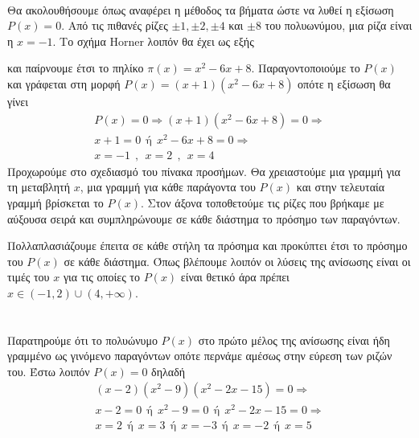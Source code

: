 \lysh\\
Θα ακολουθήσουμε όπως αναφέρει η μέθοδος τα βήματα ώστε να λυθεί η εξίσωση $ P(x)=0 $. Από τις πιθανές ρίζες $ \pm 1,\pm 2,\pm 4 $ και $ \pm8 $ του πολυωνύμου, μια ρίζα είναι η $ x=-1 $. Το σχήμα Horner λοιπόν θα έχει ως εξής
\begin{center}
\end{center}
και παίρνουμε έτσι το πηλίκο $ \pi(x)=x^2-6x+8 $. Παραγοντοποιούμε το $ P(x) $ και γράφεται στη μορφή $ P(x)=(x+1)\left(x^2-6x+8 \right) $ οπότε η εξίσωση θα γίνει
\begin{gather*}
P(x)=0\Rightarrow (x+1)\left(x^2-6x+8 \right)=0\Rightarrow\\
x+1=0\ \ \textrm{ή}\ \ x^2-6x+8=0\Rightarrow\\
x=-1\ \ ,\ \ x=2\ \ ,\ \ x=4
\end{gather*}
Προχωρούμε στο σχεδιασμό του πίνακα προσήμων. Θα χρειαστούμε μια γραμμή για τη μεταβλητή $ x $, μια γραμμή για κάθε παράγοντα του $ P(x) $ και στην τελευταία γραμμή βρίσκεται το $ P(x) $. Στον άξονα τοποθετούμε τις ρίζες που βρήκαμε με αύξουσα σειρά και συμπληρώνουμε σε κάθε διάστημα το πρόσημο των παραγόντων.
\begin{center}
\end{center}
Πολλαπλασιάζουμε έπειτα σε κάθε στήλη τα πρόσημα και προκύπτει έτσι το πρόσημο του $ P(x) $ σε κάθε διάστημα. Όπως βλέπουμε λοιπόν οι λύσεις της ανίσωσης είναι οι τιμές του $ x $ για τις οποίες το $ P(x) $ είναι θετικό άρα πρέπει $ x\in(-1,2)\cup(4,+\infty) $.\\\\
\lysh\\
Παρατηρούμε ότι το πολυώνυμο $ P(x) $ στο πρώτο μέλος της ανίσωσης είναι ήδη γραμμένο ως γινόμενο παραγόντων οπότε περνάμε αμέσως στην εύρεση των ριζών του. Έστω λοιπόν $ P(x)=0 $ δηλαδή
\begin{gather*}
(x-2)\left(x^2-9 \right)\left(x^2-2x-15\right)=0\Rightarrow\\
x-2=0\ \ \textrm{ή}\ \ x^2-9=0\ \ \textrm{ή}\ \ x^2-2x-15=0\Rightarrow\\
x=2\ \ \textrm{ή}\ \ x=3\ \ \textrm{ή}\ \ x=-3\ \ \textrm{ή}\ \ x=-2\ \ \textrm{ή}\ \ x=5
\end{gather*}

